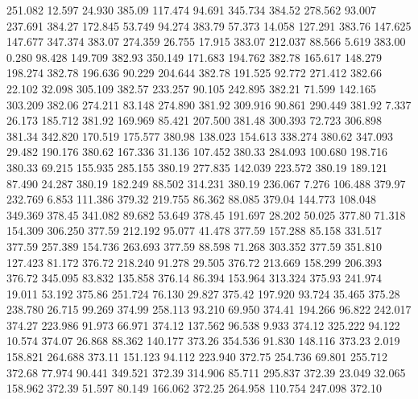  251.082   12.597   24.930       385.09
 117.474   94.691  345.734       384.52
 278.562   93.007  237.691       384.27
 172.845   53.749   94.274       383.79
  57.373   14.058  127.291       383.76
 147.625  147.677  347.374       383.07
 274.359   26.755   17.915       383.07
 212.037   88.566    5.619       383.00
   0.280   98.428  149.709       382.93
 350.149  171.683  194.762       382.78
 165.617  148.279  198.274       382.78
 196.636   90.229  204.644       382.78
 191.525   92.772  271.412       382.66
  22.102   32.098  305.109       382.57
 233.257   90.105  242.895       382.21
  71.599  142.165  303.209       382.06
 274.211   83.148  274.890       381.92
 309.916   90.861  290.449       381.92
   7.337   26.173  185.712       381.92
 169.969   85.421  207.500       381.48
 300.393   72.723  306.898       381.34
 342.820  170.519  175.577       380.98
 138.023  154.613  338.274       380.62
 347.093   29.482  190.176       380.62
 167.336   31.136  107.452       380.33
 284.093  100.680  198.716       380.33
  69.215  155.935  285.155       380.19
 277.835  142.039  223.572       380.19
 189.121   87.490   24.287       380.19
 182.249   88.502  314.231       380.19
 236.067    7.276  106.488       379.97
 232.769    6.853  111.386       379.32
 219.755   86.362   88.085       379.04
 144.773  108.048  349.369       378.45
 341.082   89.682   53.649       378.45
 191.697   28.202   50.025       377.80
  71.318  154.309  306.250       377.59
 212.192   95.077   41.478       377.59
 157.288   85.158  331.517       377.59
 257.389  154.736  263.693       377.59
  88.598   71.268  303.352       377.59
 351.810  127.423   81.172       376.72
 218.240   91.278   29.505       376.72
 213.669  158.299  206.393       376.72
 345.095   83.832  135.858       376.14
  86.394  153.964  313.324       375.93
 241.974   19.011   53.192       375.86
 251.724   76.130   29.827       375.42
 197.920   93.724   35.465       375.28
 238.780   26.715   99.269       374.99
 258.113   93.210   69.950       374.41
 194.266   96.822  242.017       374.27
 223.986   91.973   66.971       374.12
 137.562   96.538    9.933       374.12
 325.222   94.122   10.574       374.07
  26.868   88.362  140.177       373.26
 354.536   91.830  148.116       373.23
   2.019  158.821  264.688       373.11
 151.123   94.112  223.940       372.75
 254.736   69.801  255.712       372.68
  77.974   90.441  349.521       372.39
 314.906   85.711  295.837       372.39
  23.049   32.065  158.962       372.39
  51.597   80.149  166.062       372.25
 264.958  110.754  247.098       372.10
